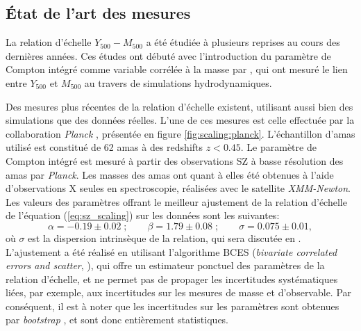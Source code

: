 \subsection{État de l'art des mesures}
\label{sec:scaling:sota}

La relation d'échelle $Y_{500}-M_{500}$ a été étudiée à plusieurs reprises au cours des dernières années.
Ces études ont débuté avec l'introduction du paramètre de Compton intégré comme variable corrélée à la masse par , qui ont mesuré le lien entre $Y_{500}$ et $M_{500}$ au travers de simulations hydrodynamiques.

Des mesures plus récentes de la relation d'échelle existent, utilisant aussi bien des simulations que des données réelles.
L'une de ces mesures est celle effectuée par la collaboration \textit{Planck} \cite{planck_collaboration_planck_2011}, présentée en figure \ref{fig:scaling:planck}.
L'échantillon d'amas utilisé est constitué de 62 amas à des redshifts $z<0.45$.
Le paramètre de Compton intégré est mesuré à partir des observations SZ à basse résolution des amas par \textit{Planck}.
Les masses des amas ont quant à elles été obtenues à l'aide d'observations X seules en spectroscopie, réalisées avec le satellite \textit{XMM-Newton}.
Les valeurs des paramètres offrant le meilleur ajustement de la relation d'échelle de l'équation (\ref{eq:sz_scaling}) sur les données sont les suivantes:
\begin{equation}
    \label{eq:scaling:planck_values}
    \alpha = -0.19 \pm 0.02\;; \qquad \beta = 1.79 \pm 0.08\;; \qquad \sigma = 0.075 \pm 0.01,
\end{equation}
où $\sigma$ est la dispersion intrinsèque de la relation, qui sera discutée en . \\
L'ajustement a été réalisé en utilisant l'algorithme BCES (\textit{bivariate correlated errors and scatter}, \cite{akritas_linear_1996}), qui offre un estimateur ponctuel des paramètres de la relation d'échelle, et ne permet pas de propager les incertitudes systématiques liées, par exemple, aux incertitudes sur les mesures de masse et d'observable.
Par conséquent, il est à noter que les incertitudes sur les paramètres sont obtenues par \textit{bootstrap} \cite{efron_bootstrap_1979}, et sont donc entièrement statistiques.

